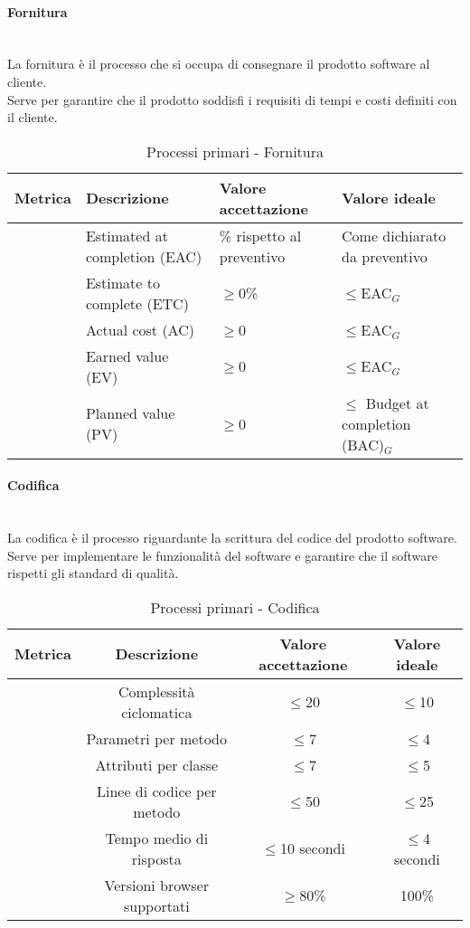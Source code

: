 \documentclass[11pt]{article}
\begin{document}
\begin{justify}
\paragraph{Fornitura}\mbox{}\\
La fornitura è il processo che si occupa di consegnare il prodotto software al cliente.\\
Serve per garantire che il prodotto soddisfi i requisiti di tempi e costi definiti con il cliente.\\
\begin{table}[H]
  \centering
\begin{tabular}{|p{1.5cm}|p{5cm}|p{4cm}|p{5cm}|}
  \hline
  \textbf{Metrica} & \textbf{Descrizione} & \textbf{Valore accettazione} & \textbf{Valore ideale}\\
  \hline
  & Estimated at completion (EAC) & \textpm5\% rispetto al preventivo & Come dichiarato da preventivo\\
  \hline
  & Estimate to complete (ETC) & $\geq$0\% & $\leq$EAC\(_G\) \\
  \hline
  & Actual cost (AC) & $\geq$0 & $\leq$EAC\(_G\) \\
  \hline
  & Earned value (EV) & $\geq$0 & $\leq$EAC\(_G\) \\
  \hline
  & Planned value (PV) & $\geq$0 & $\leq$ Budget at completion (BAC)\(_G\) \\
  \hline
\end{tabular}
\caption{Processi primari - Fornitura}
\label{tab:fornitura}
\end{table}

\newpage

\paragraph{Codifica}\mbox{}\\
La codifica è il processo riguardante la scrittura del codice del prodotto software.\\
Serve per implementare le funzionalità del software e garantire che il software rispetti gli standard di qualità.\\
\begin{table}[H]
  \centering
\begin{tabular}{|c|c|c|c|}
  \hline
  \textbf{Metrica} & \textbf{Descrizione} & \textbf{Valore accettazione} & \textbf{Valore ideale}\\
  \hline
  & Complessità ciclomatica & $\leq$20 & $\leq$10 \\
  \hline
  & Parametri per metodo & $\leq$7 & $\leq$4 \\
  \hline
  & Attributi per classe & $\leq$7 & $\leq$5 \\
  \hline
  & Linee di codice per metodo & $\leq$50 & $\leq$25 \\
  \hline
  & Tempo medio di risposta & $\leq$10 secondi & $\leq$4 secondi \\
  \hline
  & Versioni browser supportati & $\geq$80\% & 100\% \\
  \hline
\end{tabular}
\caption{Processi primari - Codifica}
\label{tab:codifica}
\end{table}



\end{justify}
\end{document}
